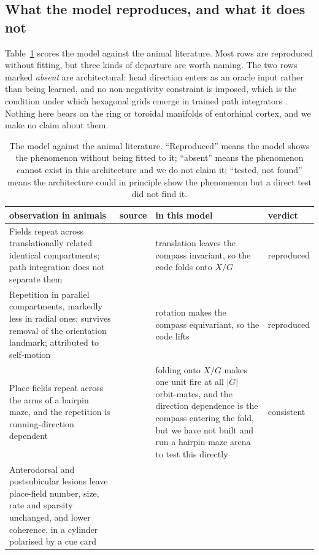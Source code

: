 \subsection*{What the model reproduces, and what it does not}

Table~\ref{tab:bio} scores the model against the animal literature. Most rows are reproduced without
fitting, but three kinds of departure are worth naming. The two rows marked \emph{absent} are
architectural: head direction enters as an oracle input rather than being learned, and no non-negativity
constraint is imposed, which is the condition under which hexagonal grids emerge in trained path
integrators \citep{sorscher2023unified}. Nothing here bears on the ring or toroidal manifolds of
entorhinal cortex, and we make no claim about them.

\begin{table}[t]
\centering
\small
\setlength{\tabcolsep}{4pt}
\caption{The model against the animal literature. ``Reproduced'' means the model shows the
phenomenon without being fitted to it; ``absent'' means the phenomenon cannot exist in this
architecture and we do not claim it; ``tested, not found'' means the architecture could in
principle show the phenomenon but a direct test did not find it.}
\label{tab:bio}
\begin{tabular}{p{}p{}p{}p{}}
\toprule
observation in animals & source & in this model & verdict \\
\midrule
Fields repeat across translationally related identical compartments; path integration does not
separate them
& \citet{spiers2015} & translation leaves the compass invariant, so the code folds onto $X/G$
& reproduced \\[4pt]
Repetition in parallel compartments, markedly less in radial ones; survives removal of the
orientation landmark; attributed to self-motion
& \citet{grieves2016} & rotation makes the compass equivariant, so the code lifts
& reproduced \\[4pt]
Place fields repeat across the arms of a hairpin maze, and the repetition is
running-direction dependent
& \citet{derdikman2009} & folding onto $X/G$ makes one unit fire at all $|G|$ orbit-mates, and
the direction dependence is the compass entering the fold, but we have not built and run a
hairpin-maze arena to test this directly
& consistent \\[4pt]
Anterodorsal and postsubicular lesions leave place-field number, size, rate and sparsity
unchanged, and lower coherence, in a cylinder polarised by a cue card

\end{tabular}
\end{table}
